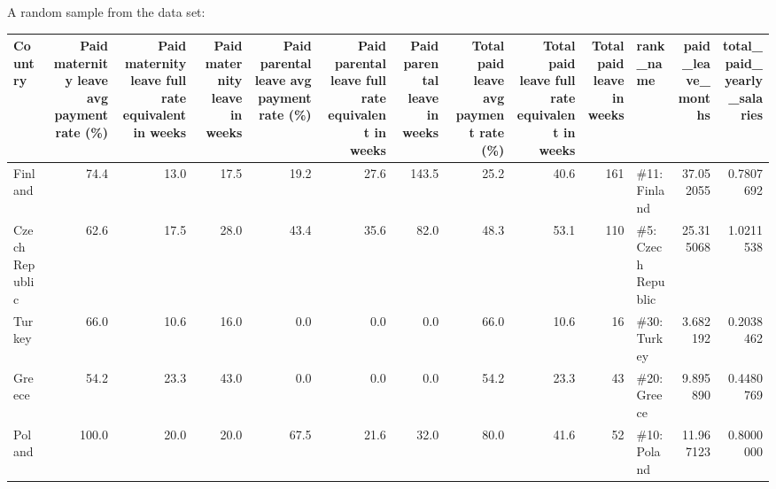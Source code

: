 \documentclass[]{book}
\theoremstyle{definition}
\theoremstyle{definition}
\theoremstyle{definition}
\theoremstyle{remark}
\begin{document}
A random sample from the data set:

\begin{tabular}{l|r|r|r|r|r|r|r|r|r|l|r|r}
\hline
Country & Paid maternity leave avg payment rate (\%) & Paid maternity leave full rate equivalent in weeks & Paid maternity leave in weeks & Paid parental leave avg payment rate (\%) & Paid parental leave full rate equivalent in weeks & Paid parental leave in weeks & Total paid leave avg payment rate (\%) & Total paid leave full rate equivalent in weeks & Total paid leave in weeks & rank\_name & paid\_leave\_months & total\_paid\_yearly\_salaries\\
\hline
Finland & 74.4 & 13.0 & 17.5 & 19.2 & 27.6 & 143.5 & 25.2 & 40.6 & 161 & \#11: Finland & 37.052055 & 0.7807692\\
\hline
Czech Republic & 62.6 & 17.5 & 28.0 & 43.4 & 35.6 & 82.0 & 48.3 & 53.1 & 110 & \#5: Czech Republic & 25.315068 & 1.0211538\\
\hline
Turkey & 66.0 & 10.6 & 16.0 & 0.0 & 0.0 & 0.0 & 66.0 & 10.6 & 16 & \#30: Turkey & 3.682192 & 0.2038462\\
\hline
Greece & 54.2 & 23.3 & 43.0 & 0.0 & 0.0 & 0.0 & 54.2 & 23.3 & 43 & \#20: Greece & 9.895890 & 0.4480769\\
\hline
Poland & 100.0 & 20.0 & 20.0 & 67.5 & 21.6 & 32.0 & 80.0 & 41.6 & 52 & \#10: Poland & 11.967123 & 0.8000000\\
\hline
\end{tabular}
\end{document}
